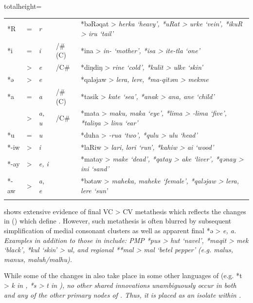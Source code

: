 \begin{table}[p]
\begin{adjustbox}{totalheight=\textheight}
\begin{tabularx}{\linewidth}{llllX}
*R	&	=	&	\it{r}		&		&	*bəRəqat > \it{herka} ‘heavy’, *uRat > \it{urke} ‘vein’, *ikuR > \it{iru} ‘tail’	\\	
*i	&	=	&	\it{i}		&	/{\#}(C){\gap}	&	*ina > \it{in-} ‘mother’, *isa > \it{ite-tla} ‘one’	\\	
		&	>	&	\it{e}		&	/{\gap}C{\#}		&	*diŋdiŋ > \it{rine} ‘cold’, *kulit > \it{ulke} ‘skin’	\\	
*ə	&	>	&	\it{e}		&									&	*qaləjaw > \it{lera, lere}, *ma-qitəm > \it{mekme}	\\	
*a	&	=	&	\it{a}		&	/{\#}(C){\gap}	&	*tasik > \it{kate} ‘sea’, *anak > \it{ana, ane} ‘child’	\\	
		&	>	&	\it{a, u}	&	/{\gap}C{\#}		&	*mata > \it{maku, maka} ‘eye’, *lima > \it{-lima} ‘five’, *taliŋa > \it{linu} ‘ear’	\\	
*u	&	=	&	\it{u}		&		&	*duha > \it{-rua} ‘two’, *qulu > \it{ulu} ‘head’	\\	
*-iw&	>	&	\it{i}		&		&	*laRiw > \it{lari, lori} ‘run’, *kahiw > \it{ai} ‘wood’	\\	
*-ay&	>	&	\it{e, i}	&		&	*matay > \it{make} ‘dead’, *qatay > \it{ake} ‘liver’, *qənay > \it{ini} ‘sand’	\\	
*-aw&	>	&	\it{a, e}	&		&	*bətaw > \it{maheka, maheke} ‘female’, *qaləjaw > \it{lera, lere} ‘sun’	\\	
		\lspbottomrule
	\end{tabularx}
\end{adjustbox}
\end{table}

 shows extensive evidence of final VC > CV metathesis which
reflects the changes in  () which define .
However, such metathesis is often blurred by subsequent simplification
of medial consonant clusters as well as apparent final *ə > \it{e, a}.
Examples in addition to those in  include: PMP *pus
> \it{hut} ‘navel’, *maqit > \it{mek} ‘black’,
*kul ‘skin’ > \it{ul},
and regional **mal > \it{mal} ‘betel pepper’
(e.g.  \it{malus},  \it{manus},
 \it{maluh/malhu}).

While some of the changes in  also take place in some other
languages of  (e.g.
*t > \it{k} in ,
*s > \it{t} in ),
no other shared innovations unambiguously occur in both 
and any of the other primary nodes of .
Thus, it is placed as an isolate within .
